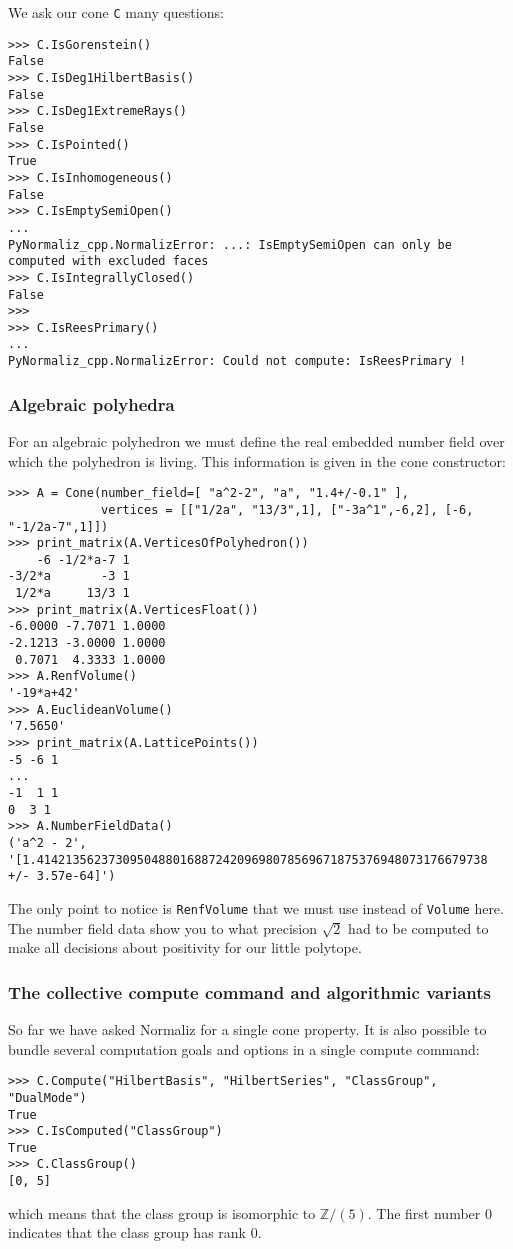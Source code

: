 \documentclass[12pt,a4paper]{scrartcl}
\theoremstyle{definition}
\def\ZZ{{\mathbb Z}}
\begin{document}
\begin{small}
We ask our cone \verb|C| many questions:
\begin{Verbatim}
>>> C.IsGorenstein()
False
>>> C.IsDeg1HilbertBasis()
False
>>> C.IsDeg1ExtremeRays()
False
>>> C.IsPointed()
True
>>> C.IsInhomogeneous()
False
>>> C.IsEmptySemiOpen()
...
PyNormaliz_cpp.NormalizError: ...: IsEmptySemiOpen can only be computed with excluded faces
>>> C.IsIntegrallyClosed()
False
>>> 
>>> C.IsReesPrimary()
...
PyNormaliz_cpp.NormalizError: Could not compute: IsReesPrimary !
\end{Verbatim}


\subsubsection{Algebraic polyhedra}

For an algebraic polyhedron we must define the real embedded number field over which the polyhedron is living. This information is given in the cone constructor:
\begin{Verbatim}
>>> A = Cone(number_field=[ "a^2-2", "a", "1.4+/-0.1" ], 
             vertices = [["1/2a", "13/3",1], ["-3a^1",-6,2], [-6, "-1/2a-7",1]])
>>> print_matrix(A.VerticesOfPolyhedron())
    -6 -1/2*a-7 1
-3/2*a       -3 1
 1/2*a     13/3 1
>>> print_matrix(A.VerticesFloat())
-6.0000 -7.7071 1.0000
-2.1213 -3.0000 1.0000
 0.7071  4.3333 1.0000
>>> A.RenfVolume()
'-19*a+42'
>>> A.EuclideanVolume()
'7.5650'
>>> print_matrix(A.LatticePoints())
-5 -6 1
...
-1  1 1
0  3 1
>>> A.NumberFieldData()
('a^2 - 2', '[1.414213562373095048801688724209698078569671875376948073176679738 +/- 3.57e-64]')
\end{Verbatim}

The only point to notice is \verb|RenfVolume| that we must use instead of \verb|Volume| here. The number field data show you to what precision $\sqrt2$ had to be computed to make all decisions about positivity for our little polytope.

\subsubsection{The collective compute command and algorithmic variants}
So far we have asked Normaliz for a single cone property. It is also possible to bundle several computation goals and options in a single compute command:
\begin{Verbatim}
>>> C.Compute("HilbertBasis", "HilbertSeries", "ClassGroup", "DualMode")
True
>>> C.IsComputed("ClassGroup")
True
>>> C.ClassGroup()
[0, 5]
\end{Verbatim}
which means that the class group is isomorphic to $\ZZ/(5)$. The first number $0$ indicates that the class group has rank $0$.


\end{small}
\end{document}

